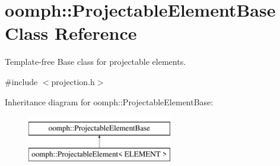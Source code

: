 \hypertarget{classoomph_1_1ProjectableElementBase}{}\section{oomph\+:\+:Projectable\+Element\+Base Class Reference}
\label{classoomph_1_1ProjectableElementBase}


Template-\/free Base class for projectable elements.  




{\ttfamily \#include $<$projection.\+h$>$}

Inheritance diagram for oomph\+:\+:Projectable\+Element\+Base\+:\begin{figure}[H]
\begin{center}
\leavevmode
\includegraphics[height=2.000000cm]{classoomph_1_1ProjectableElementBase}
\end{center}
\end{figure}
